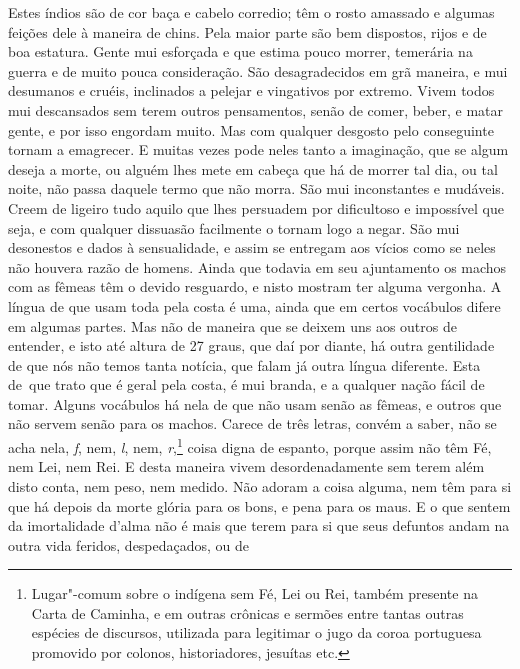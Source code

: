 Estes índios são de cor baça 								%
e cabelo corredio; têm o rosto amassado e
algumas feições dele à maneira de chins. Pela maior parte são bem %
dispostos, rijos e de boa estatura. Gente mui esforçada e que estima
pouco morrer, temerária na guerra e de muito pouca consideração. São
desagradecidos em grã maneira, e mui desumanos e cruéis, inclinados a
pelejar e vingativos por extremo. Vivem todos mui descansados sem terem
outros pensamentos, senão de comer, beber, e matar gente, e por isso
engordam muito. Mas com qualquer desgosto pelo conseguinte tornam a
emagrecer.
E muitas vezes pode neles tanto a imaginação, que se algum
deseja a morte, ou alguém lhes mete em cabeça que há de morrer tal dia,
ou tal noite, não passa daquele termo que não morra. São mui
inconstantes e mudáveis. Creem de ligeiro tudo aquilo que lhes persuadem
por dificultoso e impossível que seja, e com qualquer dissuasão
facilmente o tornam logo a negar. São mui desonestos e dados à
sensualidade, e assim se entregam aos vícios como se neles não houvera
razão de homens. Ainda que todavia em seu ajuntamento os machos com as
fêmeas têm o devido resguardo, e nisto mostram ter alguma vergonha.
A língua de que usam toda pela costa é uma, ainda que em certos			%
vocábulos difere em algumas partes. Mas não de maneira que se deixem uns
aos outros de entender, e isto até altura de 27 graus, que
daí por diante, há outra gentilidade de que nós não temos tanta
notícia, que falam já outra língua diferente. Esta \mbox{de que} trato que é
geral pela costa, é mui branda, e a qualquer nação fácil de tomar.
Alguns vocábulos há nela de que não usam senão as fêmeas, e outros que não servem
senão para os machos. Carece de três letras, convém a saber, não se		%
acha nela, \textit{f}, nem, \textit{l}, nem, \textit{r},\footnote{ Lugar"-comum sobre o indígena sem Fé, Lei
ou Rei, também presente na Carta de Caminha, e em outras crônicas e sermões entre
tantas outras espécies de discursos, utilizada para legitimar o jugo da coroa
portuguesa promovido por colonos, historiadores, jesuítas etc.} coisa digna de
espanto, porque assim não têm  \label{feleirei}%
Fé, nem Lei, nem Rei. E desta maneira vivem desordenadamente sem terem		%
além disto conta, nem peso, nem medido. Não adoram a coisa alguma, nem
têm para si que há depois da morte glória para os bons, e pena para os		%
maus. E o que sentem da imortalidade d'alma não é mais que terem para
si que seus defuntos andam na outra vida feridos, despedaçados, ou de
